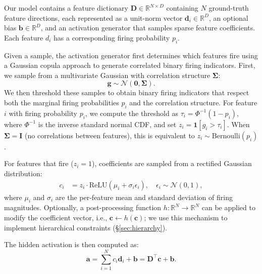 \documentclass{article}
\theoremstyle{plain}
\theoremstyle{definition}
\theoremstyle{remark}
\begin{document}
Our model contains a feature dictionary $\mathbf{D} \in \mathbb{R}^{N \times D}$ containing $N$ ground-truth feature directions, each represented as a unit-norm vector $\mathbf{d}_i \in \mathbb{R}^D$, an optional bias $\mathbf{b} \in \mathbb{R}^D$, and an activation generator that samples sparse feature coefficients. Each feature $d_i$ has a corresponding firing probability $p_i$.

Given a sample, the activation generator first determines which features fire using a Gaussian copula approach to generate correlated binary firing indicators. First, we sample from a multivariate Gaussian with correlation structure $\boldsymbol{\Sigma}$:
\begin{equation}
\mathbf{g} \sim \mathcal{N}(\mathbf{0}, \boldsymbol{\Sigma}).
\end{equation}
We then threshold these samples to obtain binary firing indicators that respect both the marginal firing probabilities $p_i$ and the correlation structure. For feature $i$ with firing probability $p_i$, we compute the threshold as $\tau_i = \Phi^{-1}(1 - p_i)$, where $\Phi^{-1}$ is the inverse standard normal CDF, and set $z_i = \mathbf{1}[g_i > \tau_i]$. When $\boldsymbol{\Sigma} = \mathbf{I}$ (no correlations between features), this is equivalent to $z_i \sim \text{Bernoulli}(p_i)$.

For features that fire ($z_i = 1$), coefficients are sampled from a rectified Gaussian distribution:
\begin{align}
c_i &= z_i \cdot \text{ReLU}(\mu_i + \sigma_i \epsilon_i), \quad \epsilon_i \sim \mathcal{N}(0, 1),
\end{align}
where $\mu_i$ and $\sigma_i$ are the per-feature mean and standard deviation of firing magnitudes. Optionally, a post-processing function $h: \mathbb{R}^N \to \mathbb{R}^N$ can be applied to modify the coefficient vector, i.e., $\mathbf{c} \leftarrow h(\mathbf{c})$; we use this mechanism to implement hierarchical constraints (\S\ref{sec:hierarchy}). 

The hidden activation is then computed as:
\begin{equation}
\mathbf{a} = \sum_{i=1}^{N} c_i \mathbf{d}_i + \mathbf{b} = \mathbf{D}^\top \mathbf{c} + \mathbf{b}.
\end{equation}
\end{document}
